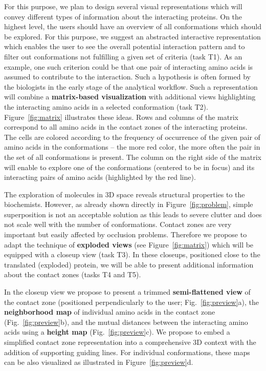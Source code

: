 \documentclass[11pt,a4paper,titlepage,oneside,onecolumn]{article}
\begin{document}
For this purpose, we plan to design several visual representations which will convey different types of information about the interacting proteins.
On the highest level, the users should have an overview of all conformations which should be explored. 
For this purpose, we suggest an abstracted interactive representation which enables the user to see the overall potential interaction pattern and to filter out conformations not fulfilling a given set of criteria (task T1).
As an example, one such criterion could be that one pair of interacting amino acids is assumed to contribute to the interaction. 
Such a hypothesis is often formed by the biologists in the early stage of the analytical workflow. 
Such a representation will combine a \textbf{matrix-based visualization} with additional views highlighting the interacting amino acids in a selected conformation (task T2).
Figure~\ref{fig:matrix} illustrates these ideas. 
Rows and columns of the matrix correspond to all amino acids in the contact zones of the interacting proteins. 
The cells are colored according to the frequency of occurrence of the given pair of amino acids in the conformations -- the more red color, the more often the pair in the set of all conformations is present.
The column on the right side of the matrix will enable to explore one of the conformations (centered to be in focus) and its interacting pairs of amino acids (highlighted by the red line).

The exploration of molecules in 3D space reveals structural properties to the biochemists.
However, as already shown directly in Figure~\ref{fig:problem}, simple superposition is not an acceptable solution as this leads to severe clutter and does not scale well with the number of conformations.
Contact zones are very important but easily affected by occlusion problems.
Therefore we propose to adapt the technique of \textbf{exploded views} (see Figure~\ref{fig:matrix}) which will be equipped with a closeup view (task T3).
In these closeups, positioned close to the translated (exploded) protein, we will be able to present additional information about the contact zones (tasks T4 and T5).

In the closeup view we propose to present a trimmed \textbf{semi-flattened view} of the contact zone (positioned perpendicularly to the user; Fig.~\ref{fig:preview}a), the \textbf{neighborhood map} of individual amino acids in the contact zone (Fig.~\ref{fig:preview}b), and the mutual distances between the interacting amino acids using a \textbf{height map} (Fig.~\ref{fig:preview}c).
We propose to embed a simplified contact zone representation into a comprehensive 3D context with the addition of supporting guiding lines.
For individual conformations, these maps can be also visualized as illustrated in Figure~\ref{fig:preview}d.
\end{document}

